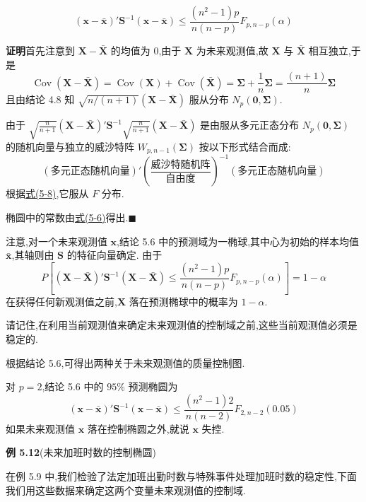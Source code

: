 \[
(\mathbf{x}-\bar{\mathbf{x}})'\mathbf{S}^{-1}(\mathbf{x}-\bar{\mathbf{x}})\leqslant\frac{(n^{2}-1)p}{n(n-p)}F_{p,n-p}(\alpha)
\]

\noindent\textbf{证明}\quad 首先注意到 $\mathbf{X}-\bar{\mathbf{X}}$ 的均值为 0,由于 $\mathbf{X}$ 为未来观测值,故 $\mathbf{X}$ 与 $\bar{\mathbf{X}}$ 相互独立,于是
\[
\operatorname{Cov}(\mathbf{X}-\bar{\mathbf{X}})=\operatorname{Cov}(\mathbf{X})+\operatorname{Cov}(\bar{\mathbf{X}})=\boldsymbol{\Sigma}+\frac{1}{n}\boldsymbol{\Sigma}=\frac{(n+1)}{n}\boldsymbol{\Sigma}
\]
且由结论 4.8 知 $\sqrt{n/(n+1)}(\mathbf{X}-\bar{\mathbf{X}})$ 服从分布 $N_p(\mathbf{0},\boldsymbol{\Sigma})$.

由于 $\sqrt{\frac{n}{n+1}}(\mathbf{X}-\bar{\mathbf{X}})'\mathbf{S}^{-1}\sqrt{\frac{n}{n+1}}(\mathbf{X}-\bar{\mathbf{X}})$ 是由服从多元正态分布 $N_p(\mathbf{0},\boldsymbol{\Sigma})$ 的随机向量与独立的威沙特阵 $W_{p,n-1}(\boldsymbol{\Sigma})$ 按以下形式结合而成:
\[
(\text{多元正态随机向量})'\left(\frac{\text{威沙特随机阵}}{\text{自由度}}\right)^{-1}(\text{多元正态随机向量})
\]
根据\hyperref[eq:5-8]{式(5-8)},它服从 $F$ 分布.

椭圆中的常数由\hyperref[eq:5-6]{式(5-6)}得出.\hfill$\blacksquare$

注意,对一个未来观测值 $\mathbf{x}$,结论 5.6 中的预测域为一椭球,其中心为初始的样本均值 $\bar{\mathbf{x}}$,其轴则由 $\mathbf{S}$ 的特征向量确定. 由于
\[
P\left[(\mathbf{X}-\bar{\mathbf{X}})'\mathbf{S}^{-1}(\mathbf{X}-\bar{\mathbf{X}})\leqslant\frac{(n^{2}-1)p}{n(n-p)}F_{p,n-p}(\alpha)\right]=1-\alpha
\]
在获得任何新观测值之前,$\mathbf{X}$ 落在预测椭球中的概率为 $1-\alpha$.

请记住,在利用当前观测值来确定未来观测值的控制域之前,这些当前观测值必须是稳定的.

根据结论 5.6,可得出两种关于未来观测值的质量控制图.


对 $p=2$,结论 5.6 中的 $95\%$ 预测椭圆为
\label{eq:5-34}
\begin{equation}
(\mathbf{x}-\bar{\mathbf{x}})'\mathbf{S}^{-1}(\mathbf{x}-\bar{\mathbf{x}})\leqslant\frac{(n^{2}-1)2}{n(n-2)}F_{2,n-2}(0.05)
\tag{5-34}
\end{equation}
如果未来观测值 $\mathbf{x}$ 落在控制椭圆之外,就说 $\mathbf{x}$ 失控.

\noindent\textbf{例 5.12}\quad (未来加班时数的控制椭圆)

在例 5.9 中,我们检验了法定加班出勤时数与特殊事件处理加班时数的稳定性,下面我们用这些数据来确定这两个变量未来观测值的控制域.

